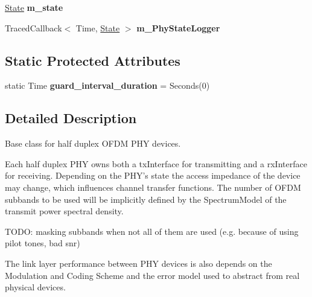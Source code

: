 \begin{DoxyCompactItemize}
\item 
\hypertarget{classns3_1_1PLC__HalfDuplexOfdmPhy_ae8b5e15753d4db61d3a9a064deb2312a}{\hyperlink{classns3_1_1PLC__HalfDuplexOfdmPhy_ae91e168f9a51bf5344e7e03d9ae13b60}{\-State} {\bfseries m\-\_\-state}}\label{classns3_1_1PLC__HalfDuplexOfdmPhy_ae8b5e15753d4db61d3a9a064deb2312a}

\item 
\hypertarget{classns3_1_1PLC__HalfDuplexOfdmPhy_adc6191b17189ec85356aba1b5f42cc93}{\-Traced\-Callback$<$ \-Time, \hyperlink{classns3_1_1PLC__HalfDuplexOfdmPhy_ae91e168f9a51bf5344e7e03d9ae13b60}{\-State} $>$ {\bfseries m\-\_\-\-Phy\-State\-Logger}}\label{classns3_1_1PLC__HalfDuplexOfdmPhy_adc6191b17189ec85356aba1b5f42cc93}

\end{DoxyCompactItemize}
\subsection*{\-Static \-Protected \-Attributes}
\begin{DoxyCompactItemize}
\item 
\hypertarget{classns3_1_1PLC__HalfDuplexOfdmPhy_a9326e8671fc183ee09d6dc35800f2a9b}{static \-Time {\bfseries guard\-\_\-interval\-\_\-duration} = \-Seconds(0)}\label{classns3_1_1PLC__HalfDuplexOfdmPhy_a9326e8671fc183ee09d6dc35800f2a9b}

\end{DoxyCompactItemize}


\subsection{\-Detailed \-Description}
\-Base class for half duplex \-O\-F\-D\-M \-P\-H\-Y devices. 

\-Each half duplex \-P\-H\-Y owns both a tx\-Interface for transmitting and a rx\-Interface for receiving. \-Depending on the \-P\-H\-Y's state the access impedance of the device may change, which influences channel transfer functions. \-The number of \-O\-F\-D\-M subbands to be used will be implicitly defined by the \-Spectrum\-Model of the transmit power spectral density.

\-T\-O\-D\-O\-: masking subbands when not all of them are used (e.\-g. because of using pilot tones, bad snr)

\-The link layer performance between \-P\-H\-Y devices is also depends on the \-Modulation and \-Coding \-Scheme and the error model used to abstract from real physical devices. 


